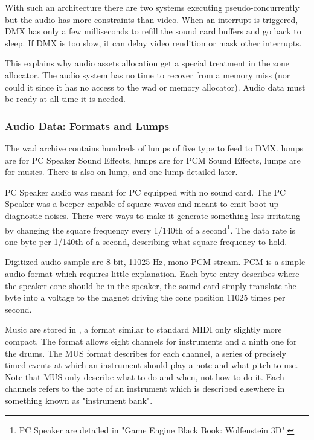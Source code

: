 With such an architecture there are two systems executing pseudo-concurrently but the audio has more constraints than video. When an interrupt is triggered, DMX has only a few milliseconds to refill the sound card buffers and go back to sleep. If DMX is too slow, it can delay video rendition or mask other interrupts.\\
\par
 This explains why audio assets allocation get a special treatment in the zone allocator. The audio system has no time to recover from a memory miss (nor could it since it has no access to the wad or memory allocator). Audio data must be ready at all time it is needed.

\subsubsection{Audio Data: Formats and Lumps}
The wad archive contains hundreds of lumps of five type to feed to DMX.  lumps are for PC Speaker Sound Effects,  lumps are for PCM Sound Effects,  lumps are for musics. There is also on  lump, and one  lump detailed later.\\
\par
PC Speaker audio was meant for PC equipped with no sound card. The PC Speaker was a beeper capable of square waves and meant to emit boot up diagnostic noises. There were ways to make it generate something less irritating by changing the square frequency every 1/140th of a second\footnote{PC Speaker are detailed in "Game Engine Black Book: Wolfenstein 3D".}. The data rate is one byte per 1/140th of a second, describing what square frequency to hold.\\
\par
 Digitized audio sample are 8-bit, 11025 Hz, mono PCM stream. PCM is a simple audio format which requires little explanation. Each byte entry describes where the speaker cone should be in the speaker, the sound card simply translate the byte into a voltage to the magnet driving the cone position 11025 times per second.\\
\par
Music are stored in , a format similar to standard MIDI only slightly more compact. The format allows eight channels for instruments and a ninth one for the drums. The MUS format describes for each channel, a series of precisely timed events at which an instrument should play a note and what pitch to use. Note that MUS only describe what to do and when, not how to do it. Each channels refers to the note of an instrument which is described elsewhere in something known as "instrument bank".\\
